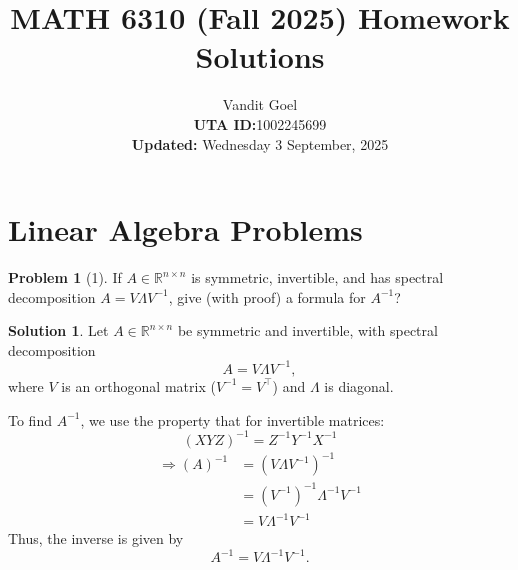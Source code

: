 \documentclass{amsart}[11pt]
\title{MATH 6310 (Fall 2025) Homework Solutions}
\author{Vandit Goel\\\textbf{UTA ID:}1002245699\\\textbf{Updated:} Wednesday  3 September, 2025}
\theoremstyle{definition}
\newtheorem*{problem}{Problem}
\newtheorem{solution}{Solution}
\newcommand{\R}{\mathbb{R}}
\begin{document}
\maketitle

\section{Linear Algebra Problems}

\begin{problem}[1]
If $A\in\R^{n\times n}$ is symmetric, invertible, and has spectral decomposition $A=V\Lambda V^{-1}$, give (with proof) a formula for $A^{-1}$?

\begin{solution}
Let $A \in \mathbb{R}^{n \times n}$ be symmetric and invertible, with spectral decomposition
\[
A = V \Lambda V^{-1},
\]
where $V$ is an orthogonal matrix ($V^{-1} = V^\top$) and $\Lambda$ is diagonal.

\vspace{\baselineskip}
\noindent To find $A^{-1}$, we use the property that for invertible matrices:
\[
(XYZ)^{-1} = Z^{-1} Y^{-1} X^{-1}
\]
\begin{align*}
	\Rightarrow(A)^{-1} &= (V \Lambda V^{-1})^{-1} \\
	&= (V^{-1})^{-1}\Lambda^{-1} V^{-1} \\
	&= V\Lambda^{-1} V^{-1}
\end{align*}
Thus, the inverse is given by
\[
A^{-1} = V \Lambda^{-1} V^{-1}.
\]
\end{solution}
\end{problem}
\end{document}
